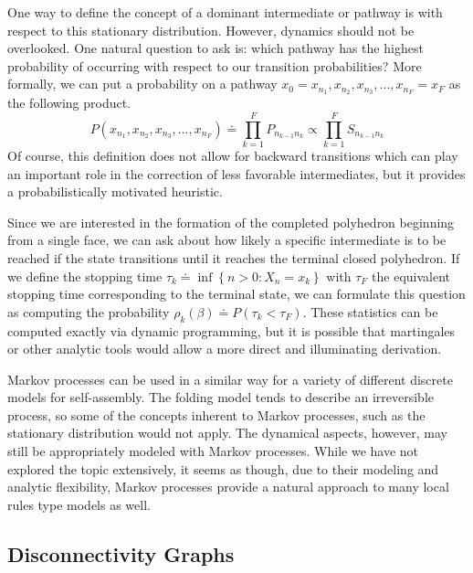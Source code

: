 One way to define the concept of a dominant intermediate or pathway is with respect to this stationary distribution. However, dynamics should not be overlooked. One natural question to ask is: which pathway has the highest probability of occurring with respect to our transition probabilities? More formally, we can put a probability on a pathway $x_0 = x_{n_1},x_{n_2},x_{n_3},...,x_{n_F}=x_F$ as the following product. 
$$P\left(x_{n_1},x_{n_2},x_{n_3},...,x_{n_F}\right) \doteq \prod_{k=1}^F P_{n_{k-1}n_k} \propto \prod^F_{k=1}S_{n_{k-1}n_k}$$
Of course, this definition does not allow for backward transitions which can play an important role in the correction of less favorable intermediates, but it provides a probabilistically motivated heuristic. 

Since we are interested in the formation of the completed polyhedron beginning from a single face, we can ask about how likely a specific intermediate is to be reached if the state transitions until it reaches the terminal closed polyhedron. If we define the stopping time $\tau_k \doteq \inf\left\{n>0: X_n = x_k\right\}$ with $\tau_F$ the equivalent stopping time corresponding to the terminal state, we can formulate this question as computing the probability $\rho_k\left(\beta\right) \doteq P\left(\tau_k < \tau_F\right)$. These statistics can be computed exactly via dynamic programming, but it is possible that martingales or other analytic tools would allow a more direct and illuminating derivation. 

Markov processes can be used in a similar way for a variety of different discrete models for self-assembly. The folding model tends to describe an irreversible process, so some of the concepts inherent to Markov processes, such as the stationary distribution would not apply. The dynamical aspects, however, may still be appropriately modeled with Markov processes. While we have not explored the topic extensively, it seems as though, due to their modeling and analytic flexibility, Markov processes provide a natural approach to many local rules type models as well. 

\subsection{Disconnectivity Graphs}

